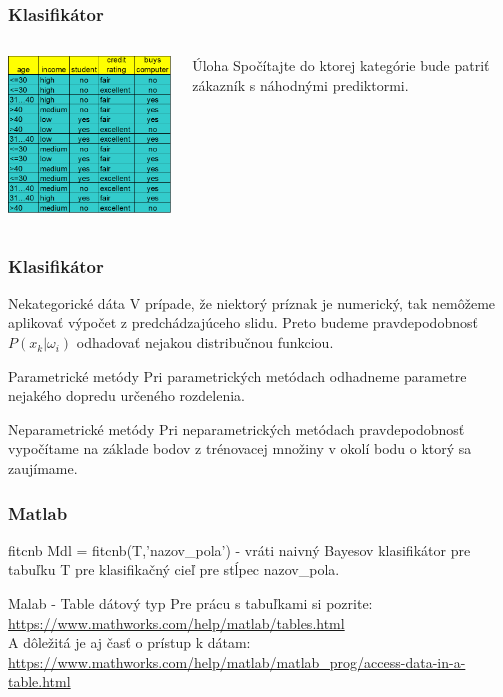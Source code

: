 \documentclass{beamer}
\begin{document}
\begin{frame}
\frametitle{Klasifikátor}
\begin{columns}[onlytextwidth,T]


  \column{70mm}
  \includegraphics[width=70mm]{table.png}
  
  \column{30mm}
  \begin{block}{Úloha}
  Spočítajte do ktorej kategórie bude patriť zákazník s náhodnými prediktormi.
  \end{block}
\end{columns}

\end{frame}


\begin{frame}
\frametitle{Klasifikátor}
\begin{block}{Nekategorické dáta}
V prípade, že niektorý príznak je numerický, tak nemôžeme aplikovať výpočet z predchádzajúceho slidu. Preto budeme pravdepodobnosť $P(x_k | \omega_i)$ odhadovať nejakou distribučnou funkciou. 
\end{block}

\begin{block}{Parametrické metódy}
Pri parametrických metódach odhadneme parametre nejakého dopredu určeného rozdelenia.
\end{block}

\begin{block}{Neparametrické metódy}
Pri neparametrických metódach pravdepodobnosť vypočítame na základe bodov z trénovacej množiny v okolí bodu o ktorý sa zaujímame.
\end{block}
\end{frame}

\begin{frame}
\frametitle{Matlab}
\begin{block}{fitcnb}
Mdl = fitcnb(T,'nazov\_pola') - vráti naivný Bayesov klasifikátor pre tabuľku T pre klasifikačný cieľ pre stĺpec nazov\_pola.
\end{block}


\begin{block}{Malab - Table dátový typ}
Pre prácu s tabuľkami si pozrite: \\
\url{https://www.mathworks.com/help/matlab/tables.html}\\
\vspace{1em}
A dôležitá je aj časť o prístup k dátam:
\url{https://www.mathworks.com/help/matlab/matlab_prog/access-data-in-a-table.html}
\end{block}
\end{frame}
\end{document}
